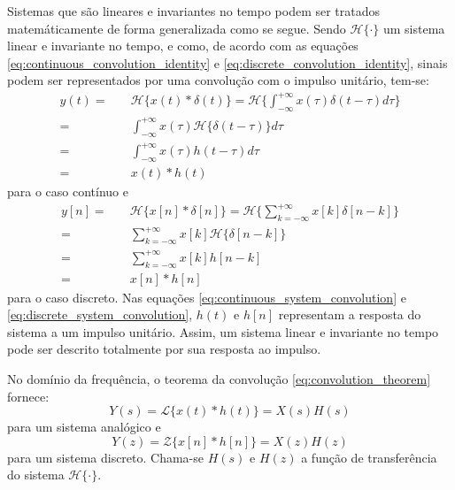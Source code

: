 \documentclass[12pt,a4paper]{report}
\begin{document}
  Sistemas que são lineares e invariantes no tempo podem ser tratados matemáticamente de forma generalizada como
  se segue. Sendo $\mathcal{H}\{\cdot\}$ um sistema linear e invariante no tempo, e como, de acordo com as
  equações \ref{eq:continuous_convolution_identity} e \ref{eq:discrete_convolution_identity}, sinais podem ser
  representados por uma convolução com o impulso unitário, tem-se:
  \begin{equation}
    \label{eq:continuous_system_convolution}
    \begin{split}
      y(t) = &\quad \mathcal{H}\{x(t) \ast \delta(t)\}
      = \mathcal{H}\{\int_{-\infty}^{+\infty} x(\tau) \delta(t - \tau) d\tau\}
      \\ = &\quad \int_{-\infty}^{+\infty} x(\tau) \mathcal{H}\{\delta(t - \tau)\} d\tau
      \\ = &\quad \int_{-\infty}^{+\infty} x(\tau) h(t - \tau) d\tau
      \\ = &\quad x(t) \ast h(t)
    \end{split}
  \end{equation}
  para o caso contínuo e
  \begin{equation}
    \label{eq:discrete_system_convolution}
    \begin{split}
      y[n] = &\quad \mathcal{H}\{x[n] \ast \delta[n]\}
      = \mathcal{H}\{\sum_{k = -\infty}^{+\infty} x[k] \delta[n - k]\}
      \\ = &\quad \sum_{k = -\infty}^{+\infty} x[k] \mathcal{H}\{\delta[n - k]\}
      \\ = &\quad \sum_{k = -\infty}^{+\infty} x[k] h[n - k]
      \\ = &\quad x[n] \ast h[n]
  \end{split}
  \end{equation}
  para o caso discreto. Nas equações \ref{eq:continuous_system_convolution} e
  \ref{eq:discrete_system_convolution}, $h(t)$ e $h[n]$ representam a resposta do sistema a um impulso unitário.
  Assim, um sistema linear e invariante no tempo pode ser descrito totalmente por sua resposta ao impulso.

  No domínio da frequência, o teorema da convolução \ref{eq:convolution_theorem} fornece:
  \begin{equation}
    Y(s) = \mathcal{L}\{x(t) \ast h(t)\} = X(s) H(s)
  \end{equation}
  para um sistema analógico e
  \begin{equation}
    Y(z) = \mathcal{Z}\{x[n] \ast h[n]\} = X(z) H(z)
  \end{equation}
  para um sistema discreto. Chama-se $H(s)$ e $H(z)$ a função de transferência do sistema $\mathcal{H\{\cdot}\}$.
\end{document}
